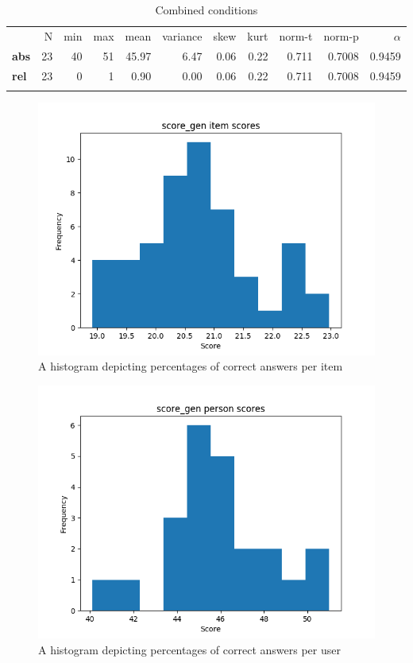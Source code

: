 \begin{longtable}[c]{@{}lrrrrrrrrrr@{}}
\caption{Combined conditions}
\endfirsthead
\toprule\addlinespace
& N & min & max & mean & variance & skew & kurt & norm-t &
norm-p & $\alpha$
\\\addlinespace
\midrule
\textbf{abs} & 23 & 40 & 51 & 45.97 & 6.47 & 0.06 & 0.22 & 0.711 &
0.7008 & 0.9459
\\\addlinespace
\textbf{rel} & 23 & 0 & 1 & 0.90 & 0.00 & 0.06 & 0.22 & 0.711 & 0.7008 &
0.9459
\\\addlinespace
\bottomrule
    \label{tab:score_gen}
\end{longtable}

\begin{figure}
    \centering
    \includegraphics[width=.7\textwidth]{img/score_gen_diff.png}
    \caption{A histogram depicting percentages of correct answers per item}
    \label{fig:score_gen_diff}
\end{figure}
\begin{figure}
    \centering
    \includegraphics[width=.7\textwidth]{img/score_gen_abil.png}
    \caption{A histogram depicting percentages of correct answers per user}
    \label{fig:score_gen_abil}
\end{figure}

